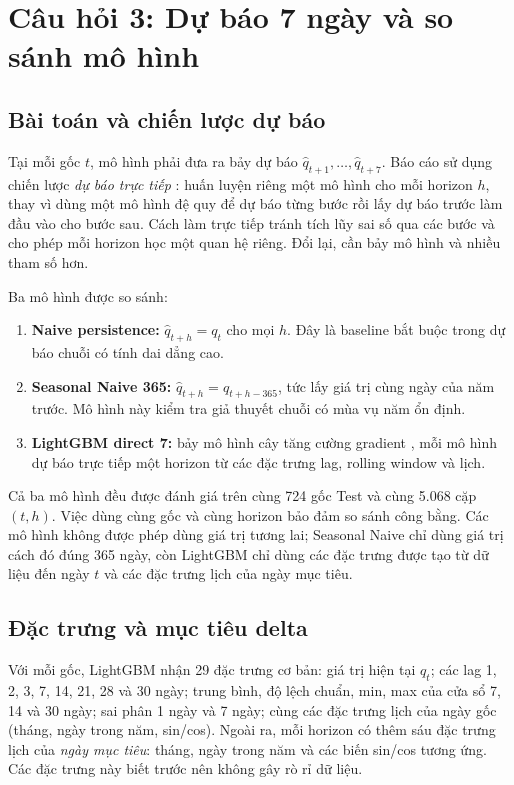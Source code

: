 \section{Câu hỏi 3: Dự báo 7 ngày và so sánh mô hình}
\label{sec:q3}

\subsection{Bài toán và chiến lược dự báo}

Tại mỗi gốc $t$, mô hình phải đưa ra bảy dự báo $\hat{q}_{t+1},\ldots,\hat{q}_{t+7}$.
Báo cáo sử dụng chiến lược \emph{dự báo trực tiếp} \cite{tashman2000}: huấn luyện
riêng một mô hình cho mỗi horizon $h$, thay vì dùng một mô hình đệ quy để dự báo từng bước rồi lấy dự báo
trước làm đầu vào cho bước sau. Cách làm trực tiếp tránh tích lũy sai số qua các
bước và cho phép mỗi horizon học một quan hệ riêng. Đổi lại, cần bảy mô hình và
nhiều tham số hơn.

Ba mô hình được so sánh:

\begin{enumerate}[leftmargin=1.6em]
  \item \textbf{Naive persistence:} $\hat{q}_{t+h}=q_t$ cho mọi $h$. Đây là baseline
  bắt buộc trong dự báo chuỗi có tính dai dẳng cao.
  \item \textbf{Seasonal Naive 365:} $\hat{q}_{t+h}=q_{t+h-365}$, tức lấy giá trị
  cùng ngày của năm trước. Mô hình này kiểm tra giả thuyết chuỗi có mùa vụ năm ổn
  định.
  \item \textbf{LightGBM direct 7:} bảy mô hình cây tăng cường gradient
  \cite{friedman2001,ke2017}, mỗi mô hình dự báo trực tiếp một horizon từ các đặc
  trưng lag, rolling window và lịch.
\end{enumerate}

Cả ba mô hình đều được đánh giá trên cùng 724 gốc Test và cùng 5.068 cặp
$(t,h)$. Việc dùng cùng gốc và cùng horizon bảo đảm so sánh công bằng. Các mô hình
không được phép dùng giá trị tương lai; Seasonal Naive chỉ dùng giá trị cách đó đúng
365 ngày, còn LightGBM chỉ dùng các đặc trưng được tạo từ dữ liệu đến ngày $t$ và
các đặc trưng lịch của ngày mục tiêu.

\subsection{Đặc trưng và mục tiêu delta}

Với mỗi gốc, LightGBM nhận 29 đặc trưng cơ bản: giá trị hiện tại $q_t$; các lag 1,
2, 3, 7, 14, 21, 28 và 30 ngày; trung bình, độ lệch chuẩn, min, max của cửa sổ 7,
14 và 30 ngày; sai phân 1 ngày và 7 ngày; cùng các đặc trưng lịch của ngày gốc
(tháng, ngày trong năm, sin/cos). Ngoài ra, mỗi horizon có thêm sáu đặc trưng lịch
của \emph{ngày mục tiêu}: tháng, ngày trong năm và các biến sin/cos tương ứng. Các
đặc trưng này biết trước nên không gây rò rỉ dữ liệu.

